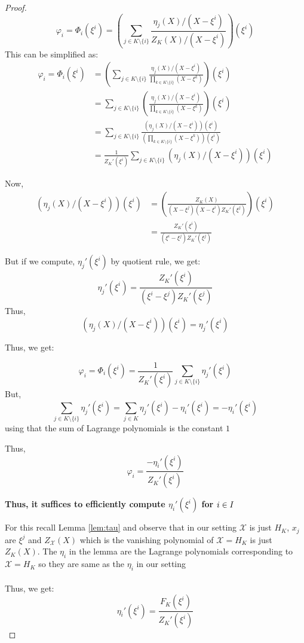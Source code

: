\begin{proof}
    $$\varphi_i = \Phi_i(\xi^i) = \left(\sum_{j\in K\setminus \{i\}}\frac{\eta_j(X)/(X-\xi^i)}{Z_K(X)/(X-\xi^i)}\right)(\xi^i)$$
    This can be simplified as:
    \begin{align*}\varphi_i = \Phi_i(\xi^i) &= \left(\sum_{j\in K\setminus \{i\}}\frac{\eta_j(X)/(X-\xi^i)}{\prod_{k \in K \setminus \{i\}}(X-\xi^k)}\right)(\xi^i)\\
    &= \sum_{j\in K\setminus \{i\}}\left(\frac{\eta_j(X)/(X-\xi^i)}{\prod_{k \in K \setminus \{i\}}(X-\xi^k)}\right)(\xi^i)\\
    &= \sum_{j\in K\setminus \{i\}}\frac{\left(\eta_j(X)/(X-\xi^i)\right)(\xi^i)}{\left(\prod_{k \in K \setminus \{i\}}(X-\xi^k)\right)(\xi^i)}\\
    &= \frac{1}{Z_K'(\xi^i)}\sum_{j\in K\setminus \{i\}}\left(\eta_j(X)/(X-\xi^i)\right)(\xi^i)
    \end{align*}

    Now, \begin{align*}
             \left(\eta_j(X)/(X-\xi^i)\right)(\xi^i)&=\left(\frac{Z_K(X)}{(X-\xi^j)(X-\xi^i)Z_K'(\xi^j)}\right)(\xi^i)\\
             &= \frac{Z_K'(\xi^i)}{(\xi^i-\xi^j)Z_K'(\xi^j)}
    \end{align*}

    But if we compute, $\eta_j'(\xi^i)$ by quotient rule, we get:
    $$\eta_j'(\xi^i)=\frac{Z_K'(\xi^i)}{(\xi^i-\xi^j)Z_K'(\xi^j)}$$
    Thus,
    $$\left(\eta_j(X)/(X-\xi^i)\right)(\xi^i)=\eta_j'(\xi^i) $$

    Thus, we get:


    $$\varphi_i =\Phi_i(\xi^i) =  \frac{1}{Z_K'(\xi^i)}\sum_{j\in K\setminus \{i\}}\eta_j'(\xi^i)$$
    But, $$\sum_{j\in K\setminus \{i\}}\eta_j'(\xi^i)= \sum_{j\in K}\eta_j'(\xi^i)-\eta_i'(\xi^i)=-\eta_i'(\xi^i)$$
    using that the sum of Lagrange polynomials is the constant $1$

    Thus,
    $$\varphi_i = \frac{-\eta_i'(\xi^i)}{Z_K'(\xi^i)}$$

    \textbf{Thus, it suffices to efficiently compute $\eta_i'(\xi^i)$ for $i\in I$}

    For this recall Lemma \ref{lem:tau} and observe that in our setting $\mathcal{X}$ is just $H_K$, $x_j$ are $\xi^j$ and $Z_\mathcal{X}(X)$ which is the vanishing polynomial of $\mathcal{X}=H_K$ is just $Z_K(X)$. The $\eta_i$ in the lemma are the Lagrange polynomials corresponding to $\mathcal{X}=H_K$ so they are same as the $\eta_i$ in our setting\\\\
    Thus, we get:
    $$\eta_i'(\xi^i)=\frac{F_K(\xi^i)}{Z_K'(\xi^i)}$$




\end{proof}
